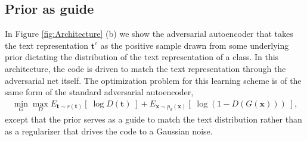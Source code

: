 \documentclass{article}
\newcommand{\bb}[1]{\boldsymbol{#1}}
\begin{document}

\subsection{Prior as guide}
\label{subsec:TextPrior}
	
	In Figure \ref{fig:Architecture} (b) we show the adversarial autoencoder that takes the text representation $\bb{t}^c$ as the positive sample drawn from some underlying prior dictating the distribution of the text representation of a class. In this architecture, the code is driven to match the text representation through the adversarial net itself. The optimization problem for this learning scheme is of the same form of the standard adversarial autoencoder,
	\begin{align}
		\min_{G} \max_D E_{\bb{t} \sim r(\bb{t})}\left[\; \log D(\bb{t}) \;\right] + E_{\bb{x} \sim p_d(\bb{x})}\left[\; \log( 1 - D(G(\bb{x})) ) \;\right],
	\end{align}
	except that the prior serves as a guide to match the text distribution rather than as a regularizer that drives the code to a Gaussian noise.










	
	
\end{document}
